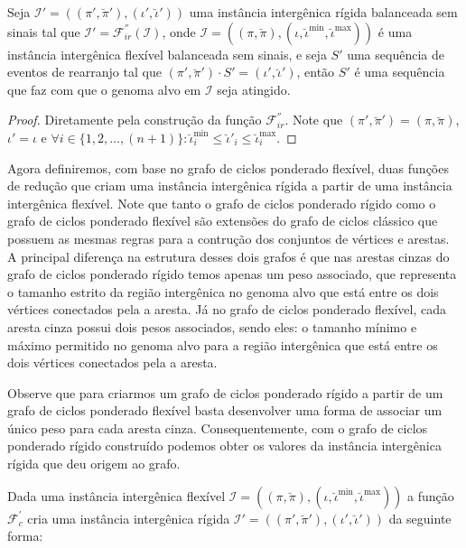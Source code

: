 \begin{lemma}\label{lemma:KIVEWTOR}
Seja $\mathcal{I'} = ((\pi',\breve\pi'),(\iota',\breve\iota'))$ uma instância intergênica rígida balanceada sem sinais tal que $\mathcal{I'} = \mathcal{F}_{ir}^{''}(\mathcal{I})$, onde $\mathcal{I} = ((\pi,\breve\pi),(\iota,\breve\iota^{\min},\breve\iota^{\max}))$ é uma instância intergênica flexível balanceada sem sinais, e seja $S'$ uma sequência de eventos de rearranjo tal que $(\pi',\breve\pi') \cdot S' = (\iota',\breve\iota')$, então $S'$ é uma sequência que faz com que o genoma alvo em $\mathcal{I}$ seja atingido.
\end{lemma}
\begin{proof}
Diretamente pela construção da função $\mathcal{F}_{ir}^{''}$. Note que $(\pi',\breve\pi') = (\pi,\breve\pi)$, $\iota' = \iota$ e $\forall i \in \{1,2,\dots,({n+1})\}: \breve\iota^{\min}_i \le \breve\iota'_i \le \breve\iota^{\max}_i$.
\end{proof}

Agora definiremos, com base no grafo de ciclos ponderado flexível, duas funções de redução que criam uma instância intergênica rígida a partir de uma instância intergênica flexível. Note que tanto o grafo de ciclos ponderado rígido como o grafo de ciclos ponderado flexível são extensões do grafo de ciclos clássico que possuem as mesmas regras para a contrução dos conjuntos de vértices e arestas. A principal diferença na estrutura desses dois grafos é que nas arestas cinzas do grafo de ciclos ponderado rígido temos apenas um peso associado, que representa o tamanho estrito da região intergênica no genoma alvo que está entre os dois vértices conectados pela a aresta. Já no grafo de ciclos ponderado flexível, cada aresta cinza possui dois pesos associados, sendo eles: o tamanho mínimo e máximo permitido no genoma alvo para a região intergênica que está entre os dois vértices conectados pela a aresta. 

Observe que para criarmos um grafo de ciclos ponderado rígido a partir de um grafo de ciclos ponderado flexível basta desenvolver uma forma de associar um único peso para cada aresta cinza. Consequentemente, com o grafo de ciclos ponderado rígido construído podemos obter os valores da instância intergênica rígida que deu origem ao grafo.

Dada uma instância intergênica flexível $\mathcal{I} = ((\pi,\breve\pi),(\iota,\breve\iota^{\min},\breve\iota^{\max}))$ a função $\mathcal{F}_{c}^{'}$ cria uma instância intergênica rígida $\mathcal{I'} = ((\pi',\breve\pi'),(\iota',\breve\iota'))$ da seguinte forma:

